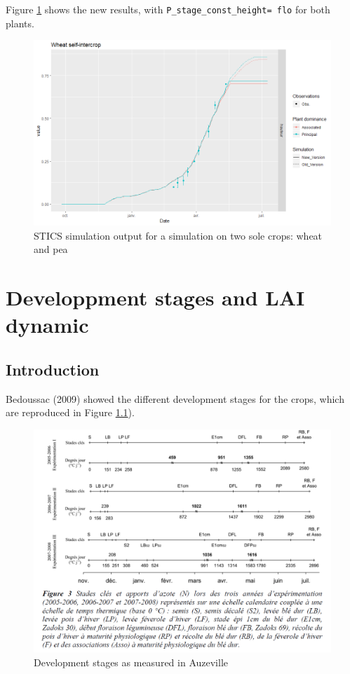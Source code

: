\documentclass[]{book}
\begin{document}
Figure \ref{fig:constheight} shows the new results, with \texttt{P\_stage\_const\_height=\ flo} for both plants.

\begin{figure}
\centering
\includegraphics{img/const_height.png}
\caption{\label{fig:constheight}STICS simulation output for a simulation on two sole crops: wheat and pea}
\end{figure}

\hypertarget{stages}{%
\chapter{Developpment stages and LAI dynamic}\label{stages}}

\hypertarget{introduction-8}{%
\section{Introduction}\label{introduction-8}}

Bedoussac (2009) showed the different development stages for the crops, which are reproduced in Figure \ref{fig:stademeas}).

\begin{figure}
\centering
\includegraphics{img/Stades.png}
\caption{\label{fig:stademeas}Development stages as measured in Auzeville}
\end{figure}
\end{document}

